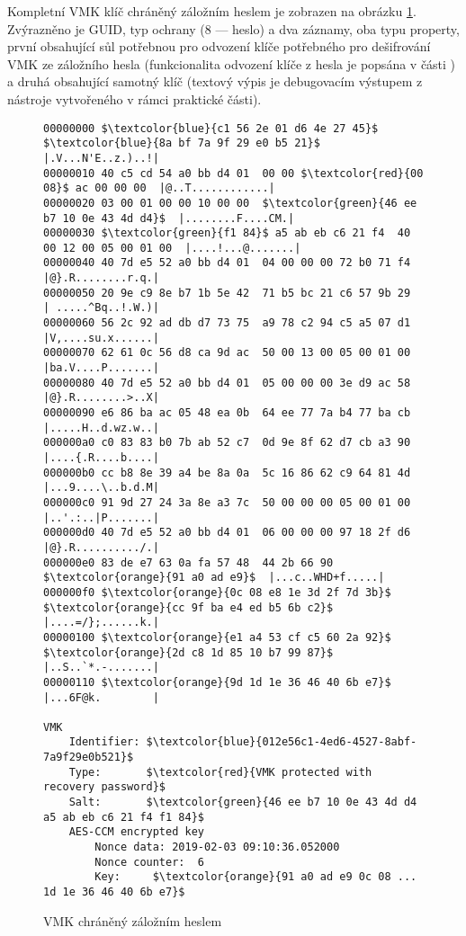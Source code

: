 Kompletní VMK klíč chráněný záložním heslem je zobrazen na obrázku \ref{fig:vmk-bpwprotected}. Zvýrazněno je GUID, typ ochrany (8 --- heslo) a dva  záznamy, oba typu property, první obsahující sůl potřebnou pro odvození klíče potřebného pro dešifrování VMK ze záložního hesla (funkcionalita odvození klíče z hesla je popsána v části ) a druhá obsahující samotný klíč (textový výpis je debugovacím výstupem z nástroje vytvořeného v rámci praktické části).

\begin{figure}[h]
		\centering
		\captionsetup{width=0.65\linewidth}
		\caption{VMK chráněný záložním heslem}
		\label{fig:vmk-bpwprotected}

\begin{lstlisting}[frame=none, escapechar=$, basicstyle=\ttfamily\small, columns=fullflexible, keepspaces=true]
00000000 $\textcolor{blue}{c1 56 2e 01 d6 4e 27 45}$  $\textcolor{blue}{8a bf 7a 9f 29 e0 b5 21}$  |.V...N'E..z.)..!|
00000010 40 c5 cd 54 a0 bb d4 01  00 00 $\textcolor{red}{00 08}$ ac 00 00 00  |@..T............|
00000020 03 00 01 00 00 10 00 00  $\textcolor{green}{46 ee b7 10 0e 43 4d d4}$  |........F....CM.|
00000030 $\textcolor{green}{f1 84}$ a5 ab eb c6 21 f4  40 00 12 00 05 00 01 00  |....!...@.......|
00000040 40 7d e5 52 a0 bb d4 01  04 00 00 00 72 b0 71 f4  |@}.R........r.q.|
00000050 20 9e c9 8e b7 1b 5e 42  71 b5 bc 21 c6 57 9b 29  | .....^Bq..!.W.)|
00000060 56 2c 92 ad db d7 73 75  a9 78 c2 94 c5 a5 07 d1  |V,....su.x......|
00000070 62 61 0c 56 d8 ca 9d ac  50 00 13 00 05 00 01 00  |ba.V....P.......|
00000080 40 7d e5 52 a0 bb d4 01  05 00 00 00 3e d9 ac 58  |@}.R........>..X|
00000090 e6 86 ba ac 05 48 ea 0b  64 ee 77 7a b4 77 ba cb  |.....H..d.wz.w..|
000000a0 c0 83 83 b0 7b ab 52 c7  0d 9e 8f 62 d7 cb a3 90  |....{.R....b....|
000000b0 cc b8 8e 39 a4 be 8a 0a  5c 16 86 62 c9 64 81 4d  |...9....\..b.d.M|
000000c0 91 9d 27 24 3a 8e a3 7c  50 00 00 00 05 00 01 00  |..'.:..|P.......|
000000d0 40 7d e5 52 a0 bb d4 01  06 00 00 00 97 18 2f d6  |@}.R........../.|
000000e0 83 de e7 63 0a fa 57 48  44 2b 66 90 $\textcolor{orange}{91 a0 ad e9}$  |...c..WHD+f.....|
000000f0 $\textcolor{orange}{0c 08 e8 1e 3d 2f 7d 3b}$  $\textcolor{orange}{cc 9f ba e4 ed b5 6b c2}$  |....=/};......k.|
00000100 $\textcolor{orange}{e1 a4 53 cf c5 60 2a 92}$  $\textcolor{orange}{2d c8 1d 85 10 b7 99 87}$  |..S..`*.-.......|
00000110 $\textcolor{orange}{9d 1d 1e 36 46 40 6b e7}$                           |...6F@k.        |

VMK
	Identifier:	$\textcolor{blue}{012e56c1-4ed6-4527-8abf-7a9f29e0b521}$
	Type:		$\textcolor{red}{VMK protected with recovery password}$
	Salt:		$\textcolor{green}{46 ee b7 10 0e 43 4d d4 a5 ab eb c6 21 f4 f1 84}$
	AES-CCM encrypted key
		Nonce data:	2019-02-03 09:10:36.052000
		Nonce counter:	6
		Key:	 $\textcolor{orange}{91 a0 ad e9 0c 08 ... 1d 1e 36 46 40 6b e7}$
\end{lstlisting}
\end{figure}


